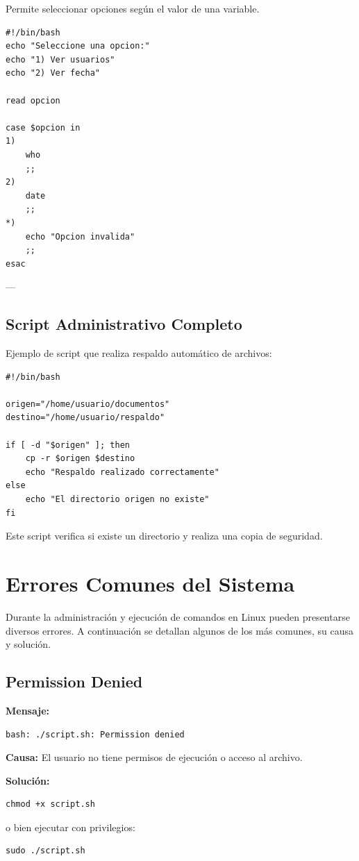 \documentclass[12pt,a4paper]{article}
\begin{document}
Permite seleccionar opciones según el valor de una variable.

\begin{lstlisting}
#!/bin/bash
echo "Seleccione una opcion:"
echo "1) Ver usuarios"
echo "2) Ver fecha"

read opcion

case $opcion in
1)
    who
    ;;
2)
    date
    ;;
*)
    echo "Opcion invalida"
    ;;
esac
\end{lstlisting}

---

\subsection{Script Administrativo Completo}

Ejemplo de script que realiza respaldo automático de archivos:

\begin{lstlisting}
#!/bin/bash

origen="/home/usuario/documentos"
destino="/home/usuario/respaldo"

if [ -d "$origen" ]; then
    cp -r $origen $destino
    echo "Respaldo realizado correctamente"
else
    echo "El directorio origen no existe"
fi
\end{lstlisting}

Este script verifica si existe un directorio y realiza una copia de seguridad.

\section{Errores Comunes del Sistema}

Durante la administración y ejecución de comandos en Linux pueden presentarse diversos errores. A continuación se detallan algunos de los más comunes, su causa y solución.

\subsection{Permission Denied}

\textbf{Mensaje:}
\begin{lstlisting}
bash: ./script.sh: Permission denied
\end{lstlisting}

\textbf{Causa:}  
El usuario no tiene permisos de ejecución o acceso al archivo.

\textbf{Solución:}
\begin{lstlisting}
chmod +x script.sh
\end{lstlisting}
o bien ejecutar con privilegios:
\begin{lstlisting}
sudo ./script.sh
\end{lstlisting}
\end{document}
